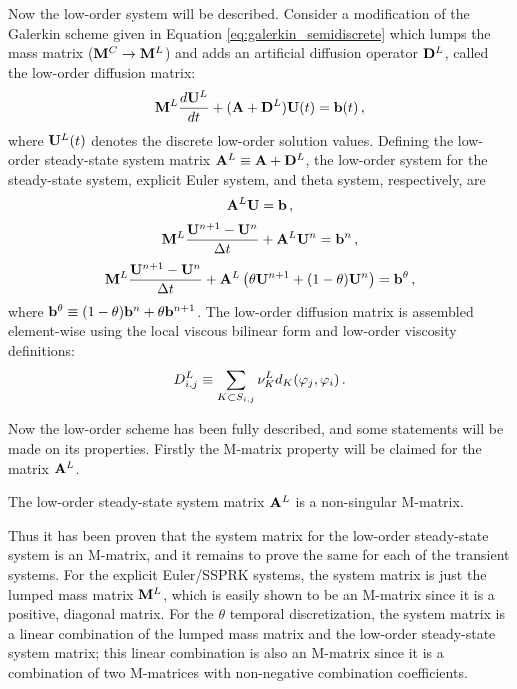 Now the low-order system will be described.
Consider a modification of the Galerkin scheme given in Equation \eqref{eq:galerkin_semidiscrete}
which lumps the mass matrix ($\mathbf{M}^C \rightarrow \mathbf{M}^L$) and adds an artificial
diffusion operator $\mathbf{D}^L$, called the low-order diffusion matrix:
\begin{equation}
  \mathbf{M}^L\frac{d\mathbf{U}^L}{dt} + (\mathbf{A} + \mathbf{D}^L)\mathbf{U}(t) = \mathbf{b}(t) \,,
\end{equation}
where $\mathbf{U}^L(t)$ denotes the discrete low-order solution values.
Defining the low-order steady-state system matrix $\mathbf{A}^L\equiv\mathbf{A} + \mathbf{D}^L$,
the low-order system for the steady-state system, explicit Euler system,
and theta system, respectively, are
\begin{equation}\label{eq:low_ss}
  \mathbf{A}^L \mathbf{U} = \mathbf{b} \,,
\end{equation}
\begin{equation}\label{eq:low_fe}
  \mathbf{M}^L\frac{\mathbf{U}^{n+1} - \mathbf{U}^n}{\Delta t} + \mathbf{A}^L\mathbf{U}^n = \mathbf{b}^n \,,
\end{equation}
\begin{equation}\label{eq:low_theta}
  \mathbf{M}^L\frac{\mathbf{U}^{n+1} - \mathbf{U}^n}{\Delta t} + \mathbf{A}^L\left(\theta\mathbf{U}^{n+1} + (1-\theta)\mathbf{U}^n\right)
    = \mathbf{b}^\theta \,,
\end{equation}
where $\mathbf{b}^\theta \equiv (1-\theta)\mathbf{b}^n + \theta\mathbf{b}^{n+1}$.
The low-order
diffusion matrix is assembled element-wise using the local viscous bilinear
form and low-order viscosity definitions:
\begin{equation}\label{eq:low_order_diffusion_matrix}
  D_{i,j}^L \equiv
    \sum\limits_{K\subset S_{i,j}}\nu^L_K
    d_K(\varphi_j,\varphi_i) \,.
\end{equation}

Now the low-order scheme has been fully described, and some statements will be
made on its properties. Firstly the M-matrix property will be claimed for
the matrix $\mathbf{A}^L$.
\begin{thm}
  The low-order steady-state system matrix $\mathbf{A}^L$ is a non-singular M-matrix.
\end{thm}

Thus it has been proven that the system matrix for the low-order steady-state
system is an M-matrix, and it remains to prove the same for each of the
transient systems. For the explicit Euler/SSPRK systems, the system matrix
is just the lumped mass matrix $\mathbf{M}^L$, which is easily shown to be an M-matrix
since it is a positive, diagonal matrix. For the $\theta$ temporal
discretization, the system matrix is a linear combination of the lumped mass
matrix and the low-order steady-state system matrix; this linear combination
is also an M-matrix since it is a combination of two M-matrices with non-negative
combination coefficients.

